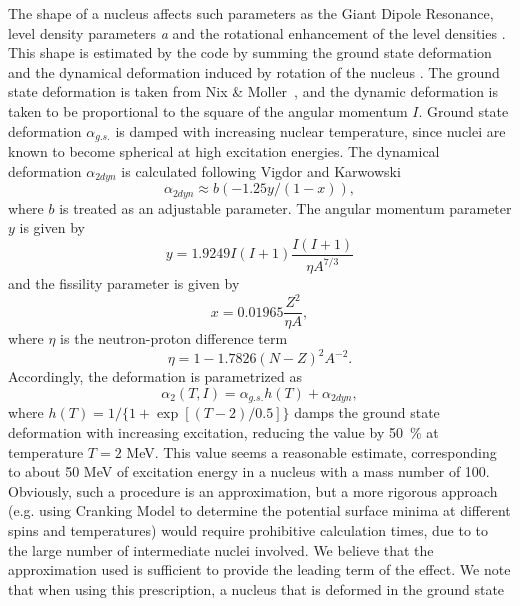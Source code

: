 The shape of a nucleus affects such parameters as the Giant Dipole
Resonance, level density parameters \emph{a} and the rotational enhancement of
the level densities%
. This shape is estimated by the code by summing the
ground state deformation and the dynamical deformation induced by rotation of
the nucleus . The ground state deformation
is taken from Nix \& Moller~\cite{masses}, and the dynamic deformation is
taken to be proportional to the square of the angular momentum $I$. Ground
state deformation $\alpha_{g.s.}$ is damped with increasing nuclear
temperature, since nuclei are known to become spherical at high excitation
energies. The dynamical deformation $\alpha_{2dyn}$ is calculated following
Vigdor and Karwowski \cite{VK}
\begin{equation}
\alpha_{2dyn}\approx b(-1.25y/(1-x)),  \label{defor}
\end{equation}
\noindent where $b$ is treated as an adjustable parameter. The angular
momentum parameter $y$ is given by
\begin{equation}
y=1.9249I(I+1)%
\frac{I(I+1)}{\eta A^{7/3}}
\end{equation}
and the fissility parameter is given by
\begin{equation}
x=0.01965\frac{Z^{2}}{\eta A},
\end{equation}
\noindent where $\eta$ is the neutron-proton difference term
\begin{equation}
\eta=1-1.7826(N-Z)^{2}A^{-2}.
\end{equation}
Accordingly, the deformation is parametrized as
\begin{equation}
\alpha_{2}(T,I)=\alpha_{g.s.}h(T)+\alpha_{2dyn},  \label{totdefor}
\end{equation}
\noindent where $h(T)=1/\{1+\exp[(T-2)/0.5]\}$ damps the ground state
deformation with increasing excitation, reducing the value by 50~\% at
temperature $T=2$ MeV. This value seems a reasonable estimate, corresponding
to about 50 MeV of excitation energy in a nucleus with a mass number
of 100. Obviously, such a procedure is an
approximation, but a more rigorous approach (e.g. using Cranking Model to
determine the potential surface minima at different spins and temperatures)
would require prohibitive calculation times, due to to the large number of
intermediate nuclei involved. We believe that the approximation
used is sufficient to provide the leading term of the effect. We note that
when using this prescription, a nucleus that is deformed in the ground state
